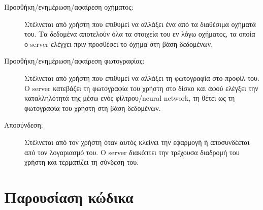 \documentclass[../thesis.tex]{subfiles}
\begin{document}
\begin{description}
    \item[Προσθήκη/ενημέρωση/αφαίρεση οχήματος:] Στέλνεται από χρήστη που επιθυμεί να αλλάξει ένα από τα διαθέσιμα οχήματά του. Τα δεδομένα αποτελούν όλα τα στοιχεία του εν λόγω οχήματος, τα οποία ο server ελέγχει πριν προσθέσει το όχημα στη βάση δεδομένων.
    \item[Προσθήκη/ενημέρωση/αφαίρεση φωτογραφίας:] Στέλνεται από χρήστη που επιθυμεί να αλλάξει τη φωτογραφία στο προφίλ του. Ο server κατεβάζει τη φωτογραφία του χρήστη στο δίσκο και αφού ελέγξει την καταλληλότητά της μέσω ενός φίλτρου/neural network, τη θέτει ως τη φωτογραφία του χρήστη στη βάση δεδομένων.
    \item[Αποσύνδεση:] Στέλνεται από τον χρήστη όταν αυτός κλείνει την εφαρμογή ή αποσυνδέεται από τον λογαριασμό του. Ο server διακόπτει την τρέχουσα διαδρομή του χρήστη και τερματίζει τη σύνδεση του.
\end{description}

\section*{Παρουσίαση κώδικα}

\end{document}
